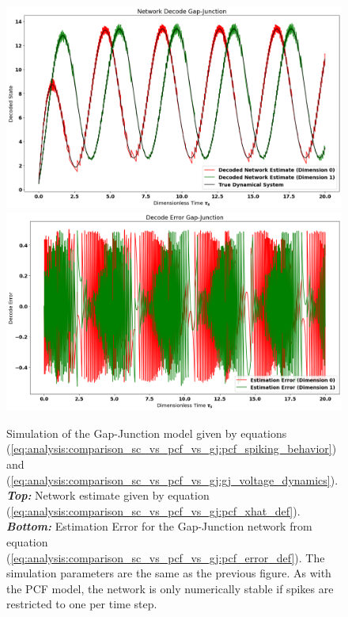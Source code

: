 \begin{enumerate}
\begin{figure}
\centering
\includegraphics[width=\linewidth]{figures/network_decode_Gap-Junction.png}
\includegraphics[width=\linewidth]{figures/decode_error_Gap-Junction.png}
\caption{Simulation of the Gap-Junction model given by equations (\ref{eq:analysis:comparison_sc_vs_pcf_vs_gj:pcf_spiking_behavior}) and (\ref{eq:analysis:comparison_sc_vs_pcf_vs_gj:gj_voltage_dynamics}). \textbf{\textit{Top:}} Network estimate given by equation (\ref{eq:analysis:comparison_sc_vs_pcf_vs_gj:pcf_xhat_def}). \textbf{\textit{Bottom:}} Estimation Error for the Gap-Junction network from equation (\ref{eq:analysis:comparison_sc_vs_pcf_vs_gj:pcf_error_def}). The simulation parameters are the same as the previous figure. As with the PCF model, the network is only numerically stable if spikes are restricted to one per time step. 
}
\label{fig:analysis:comparison_sc_vs_pcf_vs_gj:gj_network_decode_demo}
\end{figure}



\end{enumerate}
